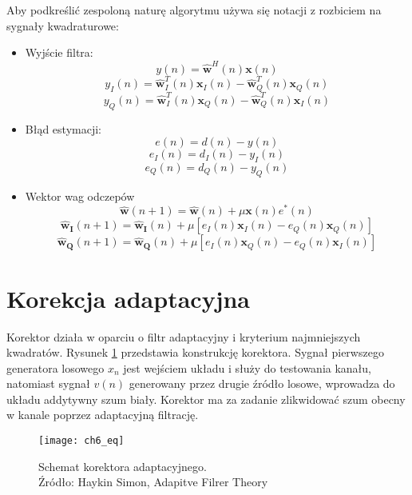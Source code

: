 Aby podkreślić zespoloną naturę algorytmu używa się notacji z rozbiciem na sygnały kwadraturowe:
\begin{itemize}
\item Wyjście filtra:
\begin{equation} \label{eq:yn}
y(n) = \bm{\hat{w}}^H(n) \bm{x}(n)
\end{equation}
\begin{equation}
y_I(n) = \bm{\hat{w}}_I^T(n) \bm{x}_I(n) - \bm{\hat{w}}_Q^T(n) \bm{x}_Q(n)
\end{equation}
\begin{equation}
y_Q(n) = \bm{\hat{w}}_I^T(n) \bm{x}_Q(n) - \bm{\hat{w}}_Q^T(n) \bm{x}_I(n)
\end{equation}
\item Błąd estymacji:
\begin{equation}
e(n) = d(n) - y(n)
\end{equation}
\begin{equation}
e_I(n) = d_I(n) - y_I(n)
\end{equation}
\begin{equation}
e_Q(n) = d_Q(n) - y_Q(n)
\end{equation}
\item Wektor wag odczepów
\begin{equation}
\bm{\hat{w}}(n+1) = \bm{\hat{w}}(n) + \mu \bm{x}(n)e^*(n)
\end{equation}
\begin{equation}
\bm{\hat{w}_I}(n+1) = \bm{\hat{w}_I}(n) + \mu [e_I(n) \bm{x}_I(n) - e_Q(n) \bm{x}_Q(n)]
\end{equation}
\begin{equation}
\bm{\hat{w}_Q}(n+1) = \bm{\hat{w}_Q}(n) + \mu [e_I(n) \bm{x}_Q(n) - e_Q(n) \bm{x}_I(n)]
\end{equation}
\end{itemize}

\section{Korekcja adaptacyjna}

Korektor działa w oparciu o filtr adaptacyjny i kryterium najmniejszych kwadratów.
Rysunek \ref{fig:eq} przedstawia konstrukcję korektora.
Sygnał pierwszego generatora losowego $x_n$ jest wejściem układu i służy do testowania kanału, natomiast sygnał $v(n)$ generowany przez drugie źródło losowe, wprowadza do układu addytywny szum biały. 
Korektor ma za zadanie zlikwidować szum obecny w kanale poprzez adaptacyjną filtrację.

\begin{figure}[ht]
\centering
\texttt{[image: ch6\_eq]}
\caption[Schemat korektora adaptacyjnego; Źródło: Simon Haykin Adapitve Filrer Theory]{Schemat korektora adaptacyjnego. \\ Źródło: Haykin Simon, Adapitve Filrer Theory \cite{Haykin:1996:AFT:230061} \endtabular}
\label{fig:eq}
\end{figure}
